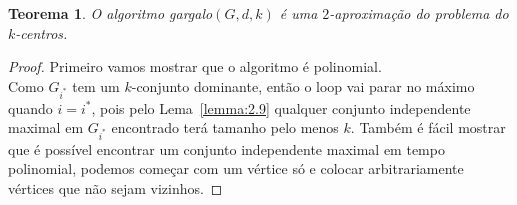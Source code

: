 \documentclass[12pt]{article}
\newtheorem{theorem}{Teorema}[section]
\begin{document}
\begin{theorem}
    O algoritmo {\sc gargalo}$(G,d,k)$ é uma $2$-aproximação do problema do $k$-centros.
\end{theorem}
\begin{proof}
    Primeiro vamos mostrar que o algoritmo é polinomial. \\
    Como $G_{i^*}$ tem um $k$-conjunto dominante, então o loop vai parar no máximo quando $i=i^*$, pois pelo Lema~\ref{lemma:2.9} qualquer conjunto independente maximal em $G_{i^*}$ encontrado terá tamanho pelo menos $k$.
    Também é fácil mostrar que é possível encontrar um conjunto independente maximal em tempo polinomial, podemos começar com um vértice só e colocar arbitrariamente vértices que não sejam vizinhos.
\end{proof}
\newpage


\end{document}

